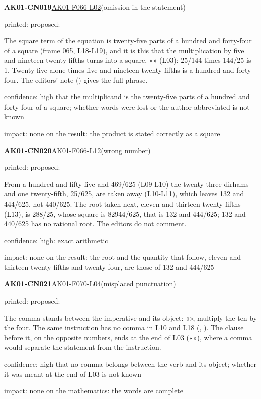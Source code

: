 \documentclass[11pt]{article}
\begin{document}
\noindent\textbf{AK01-CN019}\enspace\hyperlink{AK01-F066-L02}{AK01-F066-L02}\enspace(omission in the statement)\par\noindent printed: \enspace proposed: \par\noindent The square term of the equation is twenty-five parts of a hundred and forty-four of a square (frame 065, L18-L19), and it is this that the multiplication by five and nineteen twenty-fifths turns into a square, «» (L03): 25/144 times 144/25 is 1. Twenty-five alone times five and nineteen twenty-fifths is a hundred and forty-four. The editors' note () gives the full phrase.\par\noindent confidence: high that the multiplicand is the twenty-five parts of a hundred and forty-four of a square; whether words were lost or the author abbreviated is not known\par\noindent impact: none on the result: the product is stated correctly as a square\par\medskip
\noindent\textbf{AK01-CN020}\enspace\hyperlink{AK01-F066-L12}{AK01-F066-L12}\enspace(wrong number)\par\noindent printed: \enspace proposed: \par\noindent From a hundred and fifty-five and 469/625 (L09-L10) the twenty-three dirhams and one twenty-fifth, 25/625, are taken away (L10-L11), which leaves 132 and 444/625, not 440/625. The root taken next, eleven and thirteen twenty-fifths (L13), is 288/25, whose square is 82944/625, that is 132 and 444/625; 132 and 440/625 has no rational root. The editors do not comment.\par\noindent confidence: high: exact arithmetic\par\noindent impact: none on the result: the root and the quantity that follow, eleven and thirteen twenty-fifths and twenty-four, are those of 132 and 444/625\par\medskip
\noindent\textbf{AK01-CN021}\enspace\hyperlink{AK01-F070-L04}{AK01-F070-L04}\enspace(misplaced punctuation)\par\noindent printed: \enspace proposed: \par\noindent The comma stands between the imperative and its object: «», multiply the ten by the four. The same instruction has no comma in L10 and L18 (, ). The clause before it, on the opposite numbers, ends at the end of L03 («»), where a comma would separate the statement from the instruction.\par\noindent confidence: high that no comma belongs between the verb and its object; whether it was meant at the end of L03 is not known\par\noindent impact: none on the mathematics: the words are complete\par\medskip
\end{document}
